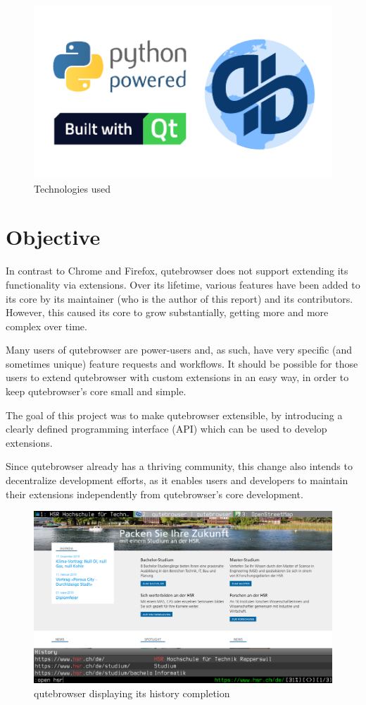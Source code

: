 \documentclass[a4paper,parskip=full,DIV=14,BCOR=15mm]{scrreprt}
\begin{document}
\begin{figure}[H]
  \centering
  \includegraphics[width=0.7\linewidth]{img/logos.pdf}
  \caption{Technologies used}
\end{figure}

\section*{Objective}

In contrast to Chrome and Firefox, qutebrowser does not support extending its
functionality via extensions. Over its lifetime, various features have been
added to its core by its maintainer (who is the author of this report) and its
contributors. However, this caused its core to grow substantially, getting more
and more complex over time.

Many users of qutebrowser are power-users and, as such, have very specific (and
sometimes unique) feature requests and workflows. It should be possible for
those users to extend qutebrowser with custom extensions in an easy way, in
order to keep qutebrowser's core small and simple.

The goal of this project was to make qutebrowser extensible, by introducing a
clearly defined programming interface (API) which can be used to develop
extensions.

Since qutebrowser already has a thriving community, this change also intends to
decentralize development efforts, as it enables users and developers to maintain
their extensions independently from qutebrowser's core development.

\begin{figure}[H]
\includegraphics[width=\linewidth]{img/screenshot-intro.png}
\caption{qutebrowser displaying its history completion}
\end{figure}
\end{document}
